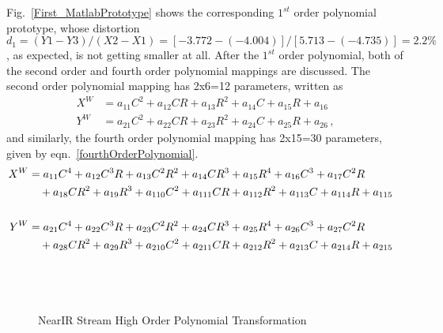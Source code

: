 %
\noindent
Fig.~\ref{First_MatlabPrototype} shows the corresponding \(1^{st}\) order polynomial prototype, whose distortion \(d_1 = (Y1 - Y3) / (X2 -X1) = [-3.772 - (-4.004)] / [5.713 - (-4.735)] = 2.2\%\), as expected, is not getting smaller at all. After the \(1^{st}\) order polynomial, both of the second order and fourth order polynomial mappings are discussed. The second order polynomial mapping has 2x6=12 parameters, written as %
%
\begin{equation}
\begin{aligned}
X^W &=  a_{11}C^2 + a_{12}CR + a_{13}R^2 + a_{14}C + a_{15}R + a_{16}
\\%
Y^W &=  a_{21}C^2 + a_{22}CR + a_{23}R^2 + a_{24}C + a_{25}R + a_{26} \, , 
\end{aligned}
\label{secondOrderPolynomial}
\end{equation}%
%
\noindent
and similarly, the fourth order polynomial mapping has 2x15=30 parameters, given by eqn.~\ref{fourthOrderPolynomial}.%
%
\begin{equation}
\hspace*{-0.3cm}%
\begin{aligned}
X^W &=  a_{11}C^4 + a_{12}C^3R + a_{13}C^2R^2 + a_{14}CR^3 + a_{15}R^4 + a_{16}C^3 + a_{17}C^2R \\%
&\,\,\,\,\,\,+ a_{18}CR^2 + a_{19}R^3 + a_{110}C^2 + a_{111}CR + a_{112}R^2 + a_{113}C + a_{114}R + a_{115}
\\\\%
Y^W &=  a_{21}C^4 + a_{22}C^3R + a_{23}C^2R^2 + a_{24}CR^3 + a_{25}R^4 + a_{26}C^3 + a_{27}C^2R \\%
&\,\,\,\,\,\,+ a_{28}CR^2 + a_{29}R^3 + a_{210}C^2 + a_{211}CR + a_{212}R^2 + a_{213}C + a_{214}R + a_{215}
\end{aligned}
\label{fourthOrderPolynomial}
\end{equation}%
\\\par%
%
%
 \begin{figure}[!t]
\centering
\hspace*{-0.3cm}
%
%
\\%
\hspace*{-0.3cm}
%
%
\caption{NearIR Stream High Order Polynomial Transformation}
\label{HighOrderNearIRRectification}
\end{figure}%
